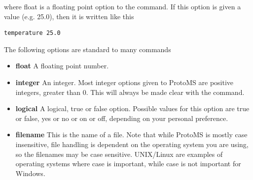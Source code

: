 \documentclass[letterpaper,10pt,english]{sphinxmanual}
\begin{document}
where float is a floating point option to the command. If this option is given a value (e.g. 25.0), then it is written like this

\begin{Verbatim}[frame=single,commandchars=\\\{\}]
temperature 25.0
\end{Verbatim}

The following options are standard to many commands
\begin{itemize}
\item {} 
\textbf{float} A floating point number.

\item {} 
\textbf{integer} An integer. Most integer options given to ProtoMS are positive integers, greater than 0. This will always be made clear with the command.

\item {} 
\textbf{logical} A logical, true or false option. Possible values for this option are true or false, yes or no or on or off, depending on your personal preference.

\item {} 
\textbf{filename} This is the name of a file. Note that while ProtoMS is mostly case insensitive, file handling is dependent on the operating system you are using, so the filenames may be case sensitive. UNIX/Linux are examples of operating systems where case is important, while case is not important for Windows.

\end{itemize}
\end{document}
